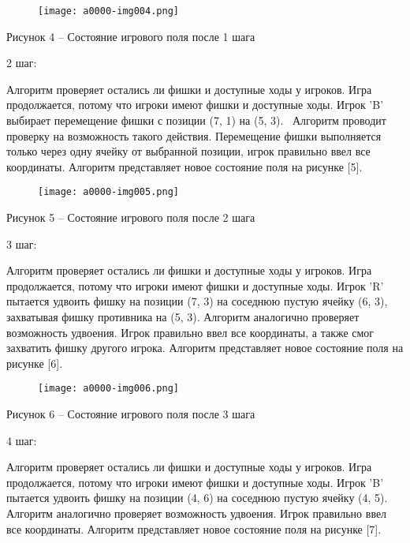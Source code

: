 \documentclass[a4paper]{article}
\begin{document}
\begin{figure}[h]
    \centering
    \texttt{[image: a0000-img004.png]}
    \end{figure}
\par
{\centering
Рисунок 4 – Состояние игрового поля после 1 шага
\par}

2 шаг:

Алгоритм проверяет остались ли фишки и доступные ходы у игроков. Игра продолжается, потому что игроки имеют фишки и
доступные ходы. Игрок 'B' выбирает перемещение фишки с позиции (7, 1) на (5, 3). \ Алгоритм проводит проверку на
возможность такого действия. Перемещение фишки выполняется только через одну ячейку от выбранной позиции, игрок
правильно ввел все координаты. Алгоритм представляет новое состояние поля на рисунке [5].


\begin{figure}[h]
    \centering
    \texttt{[image: a0000-img005.png]}
    \end{figure}  
\par
{\centering
Рисунок 5 – Состояние игрового поля после 2 шага
\par}


3 шаг:

Алгоритм проверяет остались ли фишки и доступные ходы у игроков. Игра продолжается, потому что игроки имеют фишки и
доступные ходы. Игрок 'R' пытается удвоить фишку на позиции (7, 3) на соседнюю пустую ячейку (6, 3), захватывая фишку
противника на (5, 3). Алгоритм аналогично проверяет возможность удвоения. Игрок правильно ввел все координаты, а также
смог захватить фишку другого игрока. Алгоритм представляет новое состояние поля на рисунке [6].

\begin{figure}[h]
    \centering
    \texttt{[image: a0000-img006.png]}
    \end{figure} 
\par
{\centering
Рисунок 6 – Состояние игрового поля после 3 шага
\par}

4 шаг:

Алгоритм проверяет остались ли фишки и доступные ходы у игроков. Игра продолжается, потому что игроки имеют фишки и
доступные ходы. Игрок 'B' пытается удвоить фишку на позиции (4, 6) на соседнюю пустую ячейку (4, 5). Алгоритм
аналогично проверяет возможность удвоения. Игрок правильно ввел все координаты. Алгоритм представляет новое состояние
поля на рисунке [7].
\end{document}
